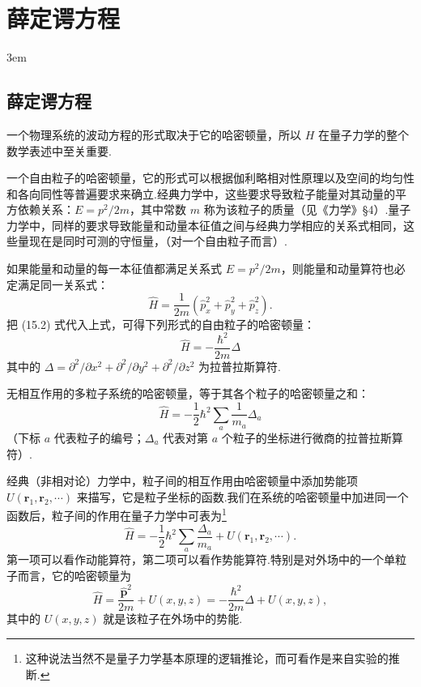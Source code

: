 \chapter{薛定谔方程}
\emergencystretch 3em

\section{薛定谔方程}

一个物理系统的波动方程的形式取决于它的哈密顿量，所以 $H$ 在量子力学的整个数学表述中至关重要.

一个自由粒子的哈密顿量，它的形式可以根据伽利略相对性原理以及空间的均匀性和各向同性等普遍要求来确立.经典力学中，这些要求导致粒子能量对其动量的平方依赖关系：$E=p^2/2m$，其中常数 $m$ 称为该粒子的质量（见《力学》§4）.量子力学中，同样的要求导致能量和动量本征值之间与经典力学相应的关系式相同，这些量现在是同时可测的守恒量，（对一个自由粒子而言）.

如果能量和动量的每一本征值都满足关系式 $E=p^2/2m$，则能量和动量算符也必定满足同一关系式：
\begin{equation}
  \hat{H}=\frac{1}{2m}\left(\hat{p}_x^2+\hat{p}_y^2+\hat{p}_z^2\right).
\end{equation}
把 (15.2) 式代入上式，可得下列形式的自由粒子的哈密顿量：
\begin{equation}
  \hat{H}=-\frac{\hbar^2}{2m}\Delta
\end{equation}
其中的 $\Delta=\partial^2/\partial x^2+\partial^2/\partial y^2+\partial^2/\partial z^2$ 为拉普拉斯算符.

无相互作用的多粒子系统的哈密顿量，等于其各个粒子的哈密顿量之和：
\begin{equation}
  \hat{H}=-\frac{1}{2}\hbar^2\sum_a\frac{1}{m_a}\Delta_a
\end{equation}
（下标 $a$ 代表粒子的编号；$\Delta_a$ 代表对第 $a$ 个粒子的坐标进行微商的拉普拉斯算符）.

经典（非相对论）力学中，粒子间的相互作用由哈密顿量中添加势能项 $U(\boldsymbol{r}_1,\boldsymbol{r}_2,\cdots)$ 来描写，它是粒子坐标的函数.我们在系统的哈密顿量中加进同一个函数后，粒子间的作用在量子力学中可表为\footnote{这种说法当然不是量子力学基本原理的逻辑推论，而可看作是来自实验的推断.}
\begin{equation}
  \hat{H}=-\frac{1}{2}\hbar^2\sum_a\frac{\Delta_a}{m_a}+U(\boldsymbol{r}_1,\boldsymbol{r}_2,\cdots).
\end{equation}
第一项可以看作动能算符，第二项可以看作势能算符.特别是对外场中的一个单粒子而言，它的哈密顿量为
\begin{equation}
  \hat{H}=\frac{\hat{\boldsymbol{p}}^2}{2m}+U(x,y,z)
  =-\frac{\hbar^2}{2m}\Delta+U(x,y,z),
\end{equation}
其中的 $U(x,y,z)$ 就是该粒子在外场中的势能.

